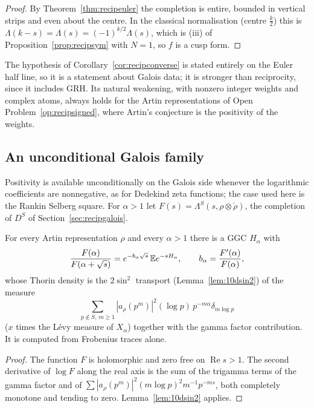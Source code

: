\begin{proof}
By Theorem~\ref{thm:recipeuler} the completion is entire, bounded in vertical strips and even about the centre. In the classical normalisation (centre $\frac k2$) this is $\Lambda(k-s)=\Lambda(s)=(-1)^{k/2}\Lambda(s)$, which is (iii) of Proposition~\ref{prop:recipsym} with $N=1$, so $f$ is a cusp form.
\end{proof}

The hypothesis of Corollary~\ref{cor:recipconverse} is stated entirely on the Euler half line, so it is a statement about Galois data; it is stronger than reciprocity, since it includes GRH. Its natural weakening, with nonzero integer weights and complex atoms, always holds for the Artin representations of Open Problem~\ref{op:recipsigned}, where Artin's conjecture is the positivity of the weights.

\subsection{An unconditional Galois family}

Positivity is available unconditionally on the Galois side whenever the logarithmic coefficients are nonnegative, as for Dedekind zeta functions; the case used here is the Rankin Selberg square. For $\alpha>1$ let $F(s)=\Lambda^S(s,\rho\otimes\check\rho)$, the completion of $D^S$ of Section~\ref{sec:recipgalois}.

\begin{proposition}\label{prop:recipfamily}
For every Artin representation $\rho$ and every $\alpha>1$ there is a GGC $H_\alpha$ with
\[
\frac{F(\alpha)}{F(\alpha+\sqrt s)}=e^{-b_\alpha\sqrt s}\,\mathbb{E} e^{-sH_\alpha},\qquad b_\alpha=\frac{F'(\alpha)}{F(\alpha)},
\]
whose Thorin density is the $2\sin^2$ transport (Lemma~\ref{lem:10dsin2}) of the measure
\[
\sum_{p\notin S,\,m\ge1}|a_\rho(p^m)|^2(\log p)\,p^{-m\alpha}\delta_{m\log p}
\]
($x$ times the L\'evy measure of $X_\alpha$) together with the gamma factor contribution. It is computed from Frobenius traces alone.
\end{proposition}

\begin{proof}
The function $F$ is holomorphic and zero free on $\operatorname{Re}s>1$. The second derivative of $\log F$ along the real axis is the sum of the trigamma terms of the gamma factor and of $\sum|a_\rho(p^m)|^2(m\log p)^2m^{-1}p^{-ms}$, both completely monotone and tending to zero. Lemma~\ref{lem:10dsin2} applies.
\end{proof}

